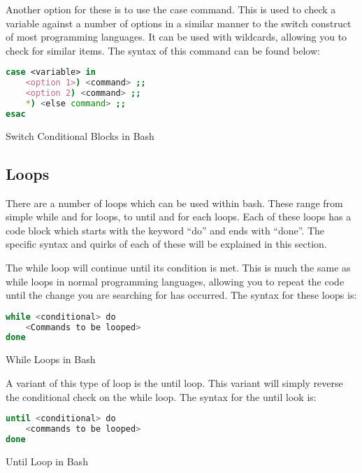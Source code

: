 			Another option for these is to use the case command. 
			This is used to check a variable against a number of options in a similar manner to the switch construct of most programming languages. 
			It can be used with wildcards, allowing you to check for similar items. 
			The syntax of this command can be found below:
			\begin{code}
			\begin{lstlisting}[language=bash]
case <variable> in
	<option 1>) <command> ;;
	<option 2) <command> ;;
	*) <else command> ;;
esac
			\end{lstlisting}
			\label{code:SwitchConditionalBlock}
			\caption{Switch Conditional Blocks in Bash}
			\end{code}
		\subsection{Loops}
			There are a number of loops which can be used within bash. 
			These range from simple while and for loops, to until  and for each loops. 
			Each of these loops has a code block which starts with the keyword ``do'' and ends with ``done''. 
			The specific syntax and quirks of each of these will be explained in this section. 

			The while loop will continue until its condition is met. 
			This is much the same as while loops in normal programming languages, allowing you to repeat the code until the change you are searching for has occurred. 
			The syntax for these loops is:
			\begin{code}
			\begin{lstlisting}[language=bash]
while <conditional> do
	<Commands to be looped>
done
			\end{lstlisting}
			\label{code:WhileBashLoops}
			\caption{While Loops in Bash}
			\end{code}
			A variant of this type of loop is the until loop. 
			This variant will simply reverse the conditional check on the while loop. 
			The syntax for the until look is:
			\begin{code}
			\begin{lstlisting}[language=bash]
until <conditional> do
	<commands to be looped>
done
			\end{lstlisting}
			\label{code:BashLoopsUntil}
			\caption{Until Loop in Bash}
			\end{code}

